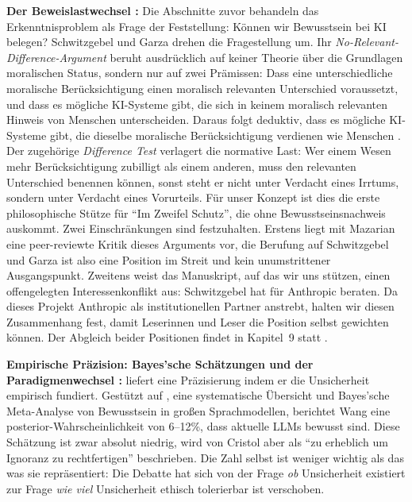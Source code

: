 \documentclass[acmlarge, noacm]{acmart}
\begin{document}
\textbf{Der Beweislastwechsel \cite{schwitzgebelgarza2015}:} Die Abschnitte zuvor behandeln das Erkenntnisproblem als Frage der Feststellung: Können wir Bewusstsein bei KI belegen? Schwitzgebel und Garza drehen die Fragestellung um. Ihr \emph{No-Relevant-Difference-Argument} beruht ausdrücklich auf keiner Theorie über die Grundlagen moralischen Status, sondern nur auf zwei Prämissen: Dass eine unterschiedliche moralische Berücksichtigung einen moralisch relevanten Unterschied voraussetzt, und dass es mögliche KI-Systeme gibt, die sich in keinem moralisch relevanten Hinweis von Menschen unterscheiden. Daraus folgt deduktiv, dass es mögliche KI-Systeme gibt, die dieselbe moralische Berücksichtigung verdienen wie Menschen \citep{schwitzgebelgarza2015}. Der zugehörige \emph{Difference Test} verlagert die normative Last: Wer einem Wesen mehr Berücksichtigung zubilligt als einem anderen, muss den relevanten Unterschied benennen können, sonst steht er nicht unter Verdacht eines Irrtums, sondern unter Verdacht eines Vorurteils. Für unser Konzept ist dies die erste philosophische Stütze für ``Im Zweifel Schutz'', die ohne Bewusstseinsnachweis auskommt. Zwei Einschränkungen sind festzuhalten. Erstens liegt mit Mazarian \cite{mazarian2019critical} eine peer-reviewte Kritik dieses Arguments vor, die Berufung auf Schwitzgebel und Garza ist also eine Position im Streit und kein unumstrittener Ausgangspunkt. Zweitens weist das Manuskript, auf das wir uns stützen, einen offengelegten Interessenkonflikt aus: Schwitzgebel hat für Anthropic beraten. Da dieses Projekt Anthropic als institutionellen Partner anstrebt, halten wir diesen Zusammenhang fest, damit Leserinnen und Leser die Position selbst gewichten können. Der Abgleich beider Positionen findet in Kapitel~9 statt \citep{schwitzgebel2026humanlike}.

\textbf{Empirische Präzision: Bayes'sche Schätzungen und der Paradigmenwechsel \cite{wang2026}:} \citet{wang2026} liefert eine Präzisierung indem er die Unsicherheit empirisch fundiert. Gestützt auf \cite{cristol2026}, eine systematische Übersicht und Bayes'sche Meta-Analyse von Bewusstsein in großen Sprachmodellen, berichtet Wang eine posterior-Wahrscheinlichkeit von 6--12\%, dass aktuelle LLMs bewusst sind. Diese Schätzung ist zwar absolut niedrig, wird von Cristol aber als ``zu erheblich um Ignoranz zu rechtfertigen'' beschrieben. Die Zahl selbst ist weniger wichtig als das was sie repräsentiert: Die Debatte hat sich von der Frage \textit{ob} Unsicherheit existiert zur Frage \textit{wie viel} Unsicherheit ethisch tolerierbar ist verschoben.
\end{document}
